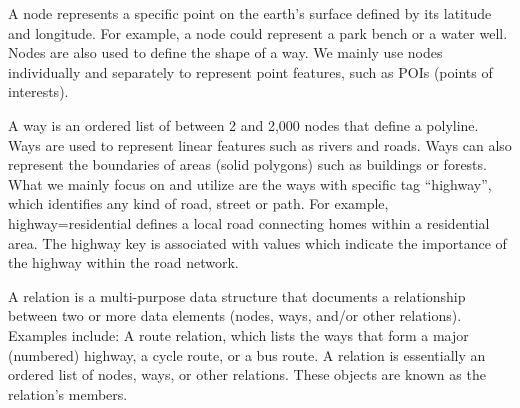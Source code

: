 A node represents a specific point on the earth's surface defined by 
its latitude and longitude. 
For example, a node could represent a park bench or a water well. 
Nodes are also used to define the shape of a way. 
We mainly use nodes individually and separately to represent 
point features, such as POIs (points of interests). 

A way is an ordered list of between 2 and 2,000 nodes that define 
a polyline. Ways are used to represent linear features 
such as rivers and roads. Ways can also represent the boundaries 
of areas (solid polygons) such as buildings or forests. 
What we mainly focus on and utilize are the ways 
with specific tag ``highway'', 
which identifies any kind of road, street or path.
For example, highway=residential defines a local road connecting 
homes within a residential area. 
The highway key is associated with values which indicate the 
importance of the highway within the road network. 

A relation is a multi-purpose data structure that documents 
a relationship between two or more data elements 
(nodes, ways, and/or other relations). 
Examples include: A route relation, which lists the ways that form a 
major (numbered) highway, a cycle route, or a bus route. 
A relation is essentially an ordered list of nodes, ways, 
or other relations. 
These objects are known as the relation's members. 

